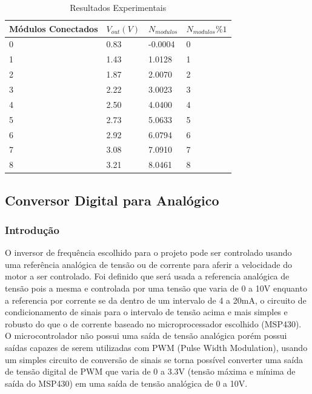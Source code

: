 \begin{table}[]
\centering
\caption{Resultados Experimentais}
\label{result-nsen3}
\begin{tabular}{|l|l|l|l|}
\hline
Módulos Conectados & $V_{out} (V)$ & $N_{modulos}$ & $N_{modulos}  \%  1$ \\ \hline
0 & 0.83 & -0.0004 & 0 \\ \hline
1 & 1.43 & 1.0128 & 1 \\ \hline
2 & 1.87 & 2.0070 & 2 \\ \hline
3 & 2.22 & 3.0023 & 3 \\ \hline
4 & 2.50 & 4.0400 & 4 \\ \hline
5 & 2.73 & 5.0633 & 5 \\ \hline
6 & 2.92 & 6.0794 & 6 \\ \hline
7 & 3.08 & 7.0910 & 7 \\ \hline
8 & 3.21 & 8.0461 & 8 \\ \hline
\end{tabular}
\end{table}

\subsection*{Conversor Digital para Analógico}
\subsubsection*{Introdução}
O inversor de frequência escolhido para o projeto pode ser controlado usando uma referência analógica de tensão ou de corrente para aferir a velocidade do motor a ser controlado. Foi definido que será usada a referencia analógica de tensão pois a mesma e controlada por uma tensão que varia de 0 a 10V enquanto a referencia por corrente se da dentro de um intervalo de 4 a 20mA, o circuito de condicionamento de sinais para o intervalo de tensão acima e mais simples e robusto do que o de corrente baseado no microprocessador escolhido (MSP430). O microcontrolador não possui uma saída de tensão analógica porém possui saídas capazes de serem utilizadas com PWM (Pulse Width Modulation), usando um simples circuito de conversão de sinais se torna possível converter uma saída de tensão digital de PWM que varia de 0 a 3.3V (tensão máxima e mínima de saída do MSP430) em uma saída de tensão analógica de 0 a 10V.
